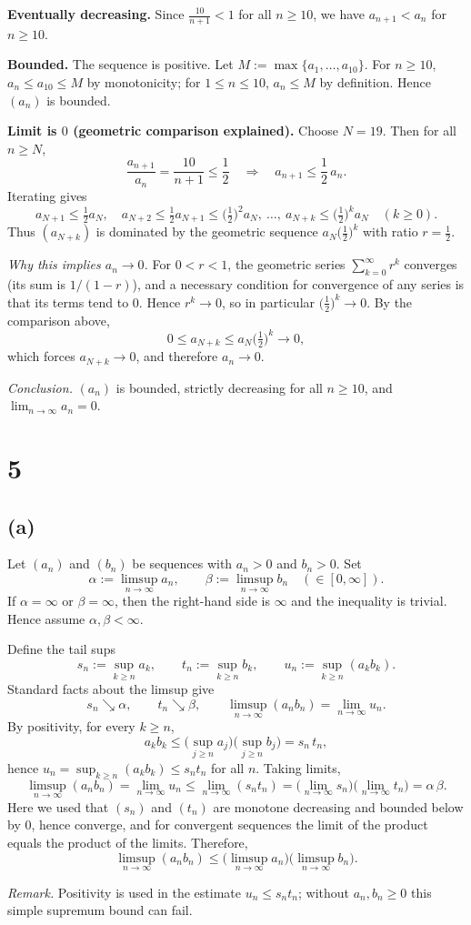 \documentclass[12pt,a4paper]{article}
\theoremstyle{definition}
\theoremstyle{remark}
\begin{document}
\textbf{Eventually decreasing.} Since $\frac{10}{n+1}<1$ for all $n\ge 10$, we have $a_{n+1}<a_n$ for $n\ge 10$.

\textbf{Bounded.} The sequence is positive. Let $M:=\max\{a_1,\dots,a_{10}\}$. For $n\ge 10$, $a_n\le a_{10}\le M$ by monotonicity; for $1\le n\le 10$, $a_n\le M$ by definition. Hence $(a_n)$ is bounded.

\textbf{Limit is $0$ (geometric comparison explained).} Choose $N=19$. Then for all $n\ge N$,
\[
\frac{a_{n+1}}{a_n}=\frac{10}{n+1}\le \frac12
\quad\Longrightarrow\quad
a_{n+1}\le \frac12\,a_n.
\]
Iterating gives
\[
a_{N+1}\le \tfrac12 a_N,\quad
a_{N+2}\le \tfrac12 a_{N+1}\le \big(\tfrac12\big)^2 a_N,\ \ldots,\
a_{N+k}\le \big(\tfrac12\big)^k a_N\quad(k\ge 0).
\]
Thus $(a_{N+k})$ is dominated by the geometric sequence $a_N\big(\tfrac12\big)^k$ with ratio $r=\tfrac12$.

\emph{Why this implies $a_n\to 0$.} For $0<r<1$, the geometric series $\sum_{k=0}^{\infty} r^k$ converges (its sum is $1/(1-r)$), and a necessary condition for convergence of any series is that its terms tend to $0$. Hence $r^k\to 0$, so in particular $\big(\tfrac12\big)^k\to 0$. By the comparison above,
\[
0\le a_{N+k}\le a_N\big(\tfrac12\big)^k\to 0,
\]
which forces $a_{N+k}\to 0$, and therefore $a_n\to 0$.

\textit{Conclusion.} $(a_n)$ is bounded, strictly decreasing for all $n\ge 10$, and $\lim_{n\to\infty} a_n=0$.



\section*{5}
\subsection*{(a)}
Let $(a_n)$ and $(b_n)$ be sequences with $a_n>0$ and $b_n>0$. Set
\[
\alpha:=\limsup_{n\to\infty} a_n,\qquad
\beta :=\limsup_{n\to\infty} b_n \quad (\in[0,\infty]).
\]
If $\alpha=\infty$ or $\beta=\infty$, then the right-hand side is $\infty$ and the inequality is trivial. Hence assume $\alpha,\beta<\infty$.

Define the tail sups
\[
s_n:=\sup_{k\ge n} a_k,\qquad t_n:=\sup_{k\ge n} b_k,\qquad
u_n:=\sup_{k\ge n}(a_k b_k).
\]
Standard facts about the limsup give
\[
s_n\searrow \alpha,\qquad t_n\searrow \beta,\qquad
\limsup_{n\to\infty}(a_n b_n)=\lim_{n\to\infty} u_n.
\]
By positivity, for every $k\ge n$,
\[
a_k b_k \le \big(\sup_{j\ge n} a_j\big)\big(\sup_{j\ge n} b_j\big)=s_n\,t_n,
\]
hence $u_n=\sup_{k\ge n}(a_k b_k)\le s_n t_n$ for all $n$. Taking limits,
\[
\limsup_{n\to\infty}(a_n b_n)
=\lim_{n\to\infty} u_n
\le \lim_{n\to\infty} (s_n t_n)
= \big(\lim_{n\to\infty}s_n\big)\big(\lim_{n\to\infty}t_n\big)
=\alpha\,\beta.
\]
Here we used that $(s_n)$ and $(t_n)$ are monotone decreasing and bounded below by $0$, hence converge, and for convergent sequences the limit of the product equals the product of the limits. Therefore,
\[
\limsup_{n\to\infty}(a_n b_n)\le \big(\limsup_{n\to\infty} a_n\big)\big(\limsup_{n\to\infty} b_n\big).
\]

\textit{Remark.} Positivity is used in the estimate $u_n\le s_n t_n$; without $a_n,b_n\ge 0$ this simple supremum bound can fail.
\end{document}
